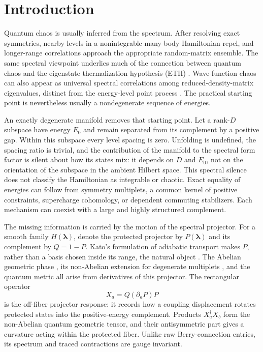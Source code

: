 \section{Introduction}
\label{sec:introduction}

Quantum chaos is usually inferred from the spectrum.  After resolving exact
symmetries, nearby levels in a nonintegrable many-body Hamiltonian repel, and
longer-range correlations approach the appropriate random-matrix ensemble.
The same spectral viewpoint underlies much of the connection between quantum
chaos and the eigenstate thermalization hypothesis (ETH)
\cite{srednicki1994,dalessio2016}.  Wave-function chaos can also appear as
universal spectral correlations among reduced-density-matrix eigenvalues,
distinct from the energy-level point process \cite{chenludwig2018}.  The
practical starting point is nevertheless usually a nondegenerate sequence of
energies.

An exactly degenerate manifold removes that starting point.  Let a rank-$D$
subspace have energy $E_0$ and remain separated from its complement by a
positive gap.  Within this subspace every level spacing is zero.  Unfolding is
undefined, the spacing ratio is trivial, and the contribution of the manifold
to the spectral form factor is silent about how its states mix: it depends on
$D$ and $E_0$, not on the orientation of the subspace in the ambient Hilbert
space.  This spectral silence does not classify the Hamiltonian as integrable
or chaotic.  Exact equality of energies can follow from symmetry multiplets, a
common kernel of positive constraints, supercharge cohomology, or dependent
commuting stabilizers.  Each mechanism can coexist with a large and highly
structured complement.

The missing information is carried by the motion of the spectral projector.
For a smooth family $H(\boldsymbol\lambda)$, denote the protected projector by
$P(\boldsymbol\lambda)$ and its complement by $Q=1-P$.  Kato's formulation of
adiabatic transport makes $P$, rather than a basis chosen inside its range,
the natural object \cite{kato1950}.  The Abelian geometric phase
\cite{berry1984}, its non-Abelian extension for degenerate multiplets
\cite{wilczekzee1984}, and the quantum metric
\cite{provostvallee1980} all arise from derivatives of this projector.  The
rectangular operator
\[
 X_a=Q(\partial_aP)P
\]
is the off-fiber projector response: it records how a coupling displacement
rotates protected states into the positive-energy complement.  Products
$X_a^\dagger X_b$ form the non-Abelian quantum geometric tensor, and their
antisymmetric part gives a curvature acting within the protected fiber.
Unlike raw Berry-connection entries, its spectrum and traced contractions are
gauge invariant.

